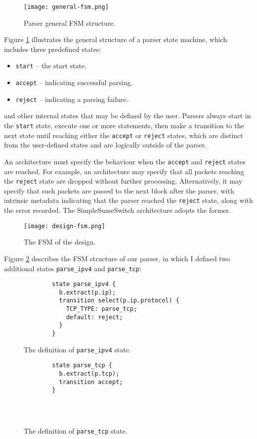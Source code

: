 \begin{figure}[h]
	\centering
	\texttt{[image: general-fsm.png]}
	\caption{Parser general FSM structure.}
	\label{general-fsm}
\end{figure}
 
Figure \ref{general-fsm} illustrates the general structure of a parser state machine, which includes three predefined states: 
\begin{itemize}
	\item \texttt{start} -- the start state.
	\item \texttt{accept} -- indicating successful parsing.
	\item \texttt{reject} -- indicating a parsing failure.
\end{itemize}
and other internal states that may be defined by the user. Parsers always start in the \texttt{start} state, execute one or more statements, then make a transition to the next state until reaching either the \texttt{accept} or \texttt{reject} states, which are distinct from the user-defined states and are logically outside of the parser. 

An architecture must specify the behaviour when the \texttt{accept} and \texttt{reject} states are reached. For example, an architecture may specify that all packets reaching the \texttt{reject} state are dropped without further processing. Alternatively, it may specify that such packets are passed to the next block after the parser, with intrinsic metadata indicating that the parser reached the \texttt{reject} state, along with the error recorded. The SimpleSumeSwitch architecture adopts the former.

\begin{figure}[h]
	\centering
	\texttt{[image: design-fsm.png]}
	\caption{The FSM of the design.}
	\label{design-fsm}
\end{figure}

Figure \ref{design-fsm} describes the FSM structure of our parser, in which I defined two additional states \texttt{parse\_ipv4} and \texttt{parse\_tcp}:

\begin{figure}[!h]
	\begin{minipage}{.48\textwidth}
		{\renewcommand{\baselinestretch}{0.8}\small
		\begin{verbatim}
		state parse_ipv4 {
		  b.extract(p.ip);
		  transition select(p.ip.protocol) {
		    TCP_TYPE: parse_tcp;
		    default: reject;
		  }
		}
		\end{verbatim}
		}
 		\caption{The definition of \texttt{parse\_ipv4} state.}
	\end{minipage}
	\hfill
	\begin{minipage}{.48\textwidth}
		{\renewcommand{\baselinestretch}{0.8}\small
		\begin{verbatim}
		state parse_tcp {
		  b.extract(p.tcp);
		  transition accept;
		}
		    
		    
		    
		\end{verbatim}
		}	
		\caption{The definition of \texttt{parse\_tcp} state.}
	\end{minipage}
\end{figure}

